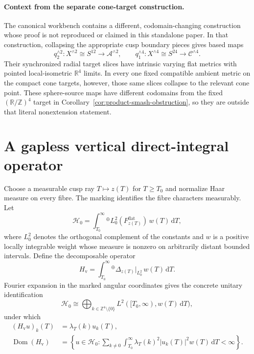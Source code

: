 \documentclass[11pt]{article}
\numberwithin{equation}{section}
\theoremstyle{definition}
\theoremstyle{remark}
\newcommand{\R}{\mathbb R}
\newcommand{\Z}{\mathbb Z}
\newcommand{\dd}{\mathrm d}
\begin{document}


\paragraph{Context from the separate cone-target construction.}
The canonical workbench contains a different, codomain-changing construction
whose proof is not reproduced or claimed in this standalone paper.  In that
construction, collapsing the appropriate cusp boundary pieces gives based
maps
\[
 q_2^{\wedge2}:X^{\wedge2}\cong S^{12}
 \longrightarrow\mathcal A^{\wedge2},
 \qquad
 q_1^{\wedge4}:X^{\wedge4}\cong S^{24}
 \longrightarrow\mathcal C^{\wedge4}.
\]
Their synchronized radial target slices have intrinsic varying flat metrics
with pointed local-isometric $\R^4$ limits.  In every one fixed compatible
ambient metric on the compact cone targets, however, those same slices
collapse to the relevant cone point.  These sphere-source maps have different
codomains from the fixed $(\R/\Z)^4$ target in
Corollary~\ref{cor:product-smash-obstruction}, so they are outside that
literal nonextension statement.

\section{A gapless vertical direct-integral operator}

Choose a measurable cusp ray $T\mapsto z(T)$ for $T\ge T_0$ and normalize Haar measure on every fibre.  The marking identifies the fibre characters measurably.  Let
\begin{equation}\label{eq:direct-integral-space}
 \mathcal H_0=
 \int_{T_0}^{\infty}{}^{\oplus}
 L_0^2(F_{z(T)}^{\mathrm{flat}})\,w(T)\,\dd T,
\end{equation}
where $L_0^2$ denotes the orthogonal complement of the constants and $w$ is a positive locally integrable weight whose measure is nonzero on arbitrarily distant bounded intervals.  Define the decomposable operator
\begin{equation}\label{eq:direct-integral-operator}
 H_{\mathrm v}=
 \int_{T_0}^{\infty}{}^{\oplus}
 \Delta_{z(T)}\big|_{L_0^2}\,w(T)\,\dd T.
\end{equation}
Fourier expansion in the marked angular coordinates gives the concrete
unitary identification
\begin{equation}\label{eq:direct-integral-Fourier-sum}
 \mathcal H_0\cong
 \bigoplus_{k\in\Z^4\setminus\{0\}}
 L^2([T_0,\infty),w(T)\,\dd T),
\end{equation}
under which
\begin{equation}\label{eq:direct-integral-domain}
 \begin{split}
 (H_{\mathrm v}u)_k(T)&=\lambda_T(k)u_k(T),\\
 \operatorname{Dom}(H_{\mathrm v})
 &=\left\{u\in\mathcal H_0:
 \sum_{k\ne0}\int_{T_0}^{\infty}
 \lambda_T(k)^2|u_k(T)|^2w(T)\,\dd T<\infty\right\}.
 \end{split}
\end{equation}
\end{document}

